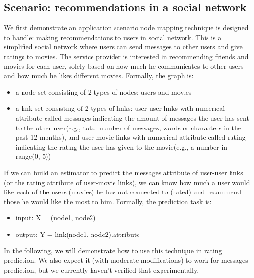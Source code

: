 \documentclass{article}
\begin{document}
\subsection{Scenario: recommendations in a social network}
We first demonstrate an application scenario node mapping technique is designed 
to handle: making recommendations to users in social network.
This is a simplified social network where users can send messages to other 
users and give ratings to movies.
The service provider is interested in recommending friends and movies for each 
user, solely based on how much he communicates to other users and how much 
he likes different movies.
Formally, the graph is:
\begin{itemize}
	\item a node set consisting of 2 types of nodes: users and movies
	\item a link set consisting of 2 types of links: user-user links with 
	numerical attribute called messages indicating the amount of messages the 
	user has sent to the other user(e.g., total number of messages, words 
	or characters in the past 12 months),
	and user-movie links with numerical attribute called rating indicating the 
	rating the user has given to the movie(e.g., a number in range(0, 5))
\end{itemize}
If we can build an estimator to predict the messages attribute of user-user 
links (or the rating attribute of user-movie links), we can know how much a 
user would like each of the users (movies) he has not connected to (rated) and 
recommend those he would like the most to him.
Formally, the prediction task is:
\begin{itemize}
	\item input: X = (node1, node2)
	\item output: Y = link(node1, node2).attribute
\end{itemize}
In the following, we will demonstrate how to use this technique in rating 
prediction.
We also expect it (with moderate modifications) to work for messages 
prediction, but we currently haven't verified that experimentally.
\end{document}
